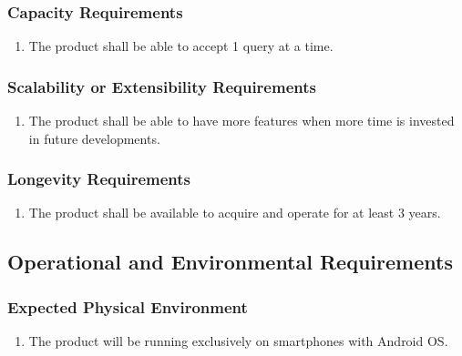 \documentclass[]{article}
\begin{document}
\subsubsection{Capacity Requirements}
\label{ssub:capacity_requirements}
\begin{enumerate}[{PR}5. ]
	\item The product shall be able to accept 1 query at a time.
\end{enumerate}

\subsubsection{Scalability or Extensibility Requirements}
\label{ssub:scalability_or_extensibility_requirements}
\begin{enumerate}[{PR}6. ]
	\item The product shall be able to have more features when more time is invested in future developments.
\end{enumerate}

\subsubsection{Longevity Requirements}
\label{ssub:longevity_requirements}
\begin{enumerate}[{PR}7. ]
	\item The product shall be available to acquire and operate for at least 3 years.
\end{enumerate}


\subsection{Operational and Environmental Requirements}
\label{sub:operational_and_environmental_requirements}

\subsubsection{Expected Physical Environment}
\label{ssub:expected_physical_environment}
\begin{enumerate}[{OE}1. ]
	\item The product will be running exclusively on smartphones with Android OS.
\end{enumerate}
\end{document}
